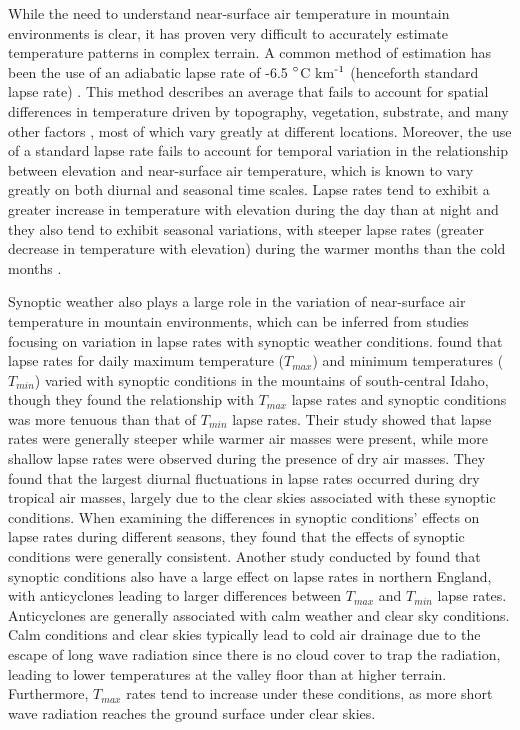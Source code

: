 \documentclass{ametsoc}
\begin{document}
While the need to understand near-surface air temperature in mountain
environments is clear, it has proven very difficult to accurately estimate
temperature patterns in complex terrain.  A common method of estimation  has
been the use of an adiabatic lapse rate of -6.5 $\degree$C
km$\textsuperscript{-1}$  (henceforth standard lapse rate)
\citep[e.g.][]{Martinec1986}.  This method describes  an average that fails to
account for spatial differences in temperature driven  by topography,
vegetation, substrate, and many other factors \citep{Barry2008,Geiger2009},
most of which vary greatly at different locations.  Moreover, the use of a
standard lapse  rate fails to account for temporal variation in the relationship
between elevation and  near-surface air temperature, which is known to vary
greatly on both diurnal and seasonal  time scales.  Lapse rates tend to exhibit
a greater increase in temperature with elevation  during the day than at night
and they also tend to exhibit seasonal variations, with  steeper lapse rates
(greater decrease in temperature with elevation) during the warmer  months than
the cold months \citep{Barry2008,Rolland2003,Pepin1999}.

Synoptic weather also plays a large role in the variation of near-surface air
temperature in mountain  environments, which can be inferred from studies
focusing on variation in lapse rates  with synoptic weather conditions.
\citet{Blandford2008a} found that lapse rates for  daily maximum temperature ($T_{max}$) and minimum
temperatures ($T_{min}$) varied with synoptic conditions in the mountains  of south-central
Idaho, though they found the relationship with $T_{max}$ lapse  rates
and synoptic conditions was more tenuous than that of $T_{min}$ lapse
rates. Their study showed that lapse rates were generally steeper while warmer
air masses were present,  while more shallow lapse rates were observed during
the presence of dry air masses.  They found that the largest diurnal
fluctuations in lapse rates occurred during dry tropical air masses, largely due
to the clear skies associated with these synoptic conditions.  When examining
the  differences in synoptic conditions' effects on lapse rates during different
seasons, they found that the effects of synoptic conditions were generally
consistent. Another study conducted by \citet{Pepin1999} found that synoptic
conditions also have a  large effect on lapse rates in northern England, with
anticyclones leading to larger differences between $T_{max}$ and $T_{min}$ 
lapse rates.  Anticyclones are generally associated with calm
weather and clear sky conditions.  Calm conditions and clear skies typically
lead to cold air drainage due to the escape of long wave radiation since there
is no cloud  cover to trap the radiation, leading to lower temperatures at the
valley floor than at higher  terrain.  Furthermore, $T_{max}$
rates tend to increase under these  conditions, as more short wave radiation
reaches the ground surface under clear skies.
\end{document}
